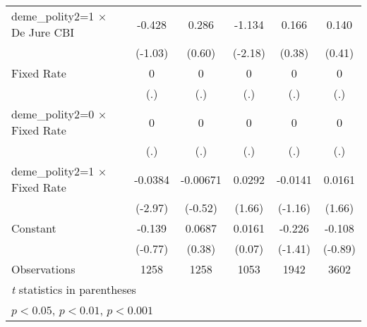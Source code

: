 \begin{table}[htbp]
\begin{tabular}{l*{5}{c}}
deme\_polity2=1 $\times$ De Jure CBI     &   -0.428         &    0.286         &   -1.134\sym{*}  &    0.166         &    0.140         \\
                                        &  (-1.03)         &   (0.60)         &  (-2.18)         &   (0.38)         &   (0.41)         \\
\addlinespace
Fixed Rate                              &        0         &        0         &        0         &        0         &        0         \\
                                        &      (.)         &      (.)         &      (.)         &      (.)         &      (.)         \\
\addlinespace
deme\_polity2=0 $\times$ Fixed Rate      &        0         &        0         &        0         &        0         &        0         \\
                                        &      (.)         &      (.)         &      (.)         &      (.)         &      (.)         \\
\addlinespace
deme\_polity2=1 $\times$ Fixed Rate      &  -0.0384\sym{**} & -0.00671         &   0.0292         &  -0.0141         &   0.0161         \\
                                        &  (-2.97)         &  (-0.52)         &   (1.66)         &  (-1.16)         &   (1.66)         \\
\addlinespace
Constant                                &   -0.139         &   0.0687         &   0.0161         &   -0.226         &   -0.108         \\
                                        &  (-0.77)         &   (0.38)         &   (0.07)         &  (-1.41)         &  (-0.89)         \\
\midrule
Observations                            &     1258         &     1258         &     1053         &     1942         &     3602         \\
\bottomrule
\multicolumn{6}{l}{\footnotesize \textit{t} statistics in parentheses}\\
\multicolumn{6}{l}{\footnotesize \sym{*} \(p<0.05\), \sym{**} \(p<0.01\), \sym{***} \(p<0.001\)}\\
\end{tabular}
\end{table}
